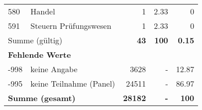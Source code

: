 \begin{longtable}{lXrrr}
        580 & \multicolumn{1}{X}{Handel} & %
          \num{1} &
          \num[round-mode=places,round-precision=2]{2.33} &
          \num[round-mode=places,round-precision=2]{0} \\

        591 & \multicolumn{1}{X}{Steuern Prüfungswesen} & %
          \num{1} &
          \num[round-mode=places,round-precision=2]{2.33} &
          \num[round-mode=places,round-precision=2]{0} \\

     \midrule
     \multicolumn{2}{l}{Summe (gültig)} &
       \textbf{\num{43}} &
     \textbf{\num{100}} &
       \textbf{\num[round-mode=places,round-precision=2]{0.15}} \\
     \multicolumn{5}{l}{\textbf{Fehlende Werte}}\\
       -998 &
       keine Angabe &
         \num{3628} &
        - &
         \num[round-mode=places,round-precision=2]{12.87} \\
       -995 &
       keine Teilnahme (Panel) &
         \num{24511} &
        - &
         \num[round-mode=places,round-precision=2]{86.97} \\
     \midrule
     \multicolumn{2}{l}{\textbf{Summe (gesamt)}} &
          \textbf{\num{28182}} &
        \textbf{-} &
        \textbf{\num{100}} \\
     \bottomrule
     \end{longtable}
     
